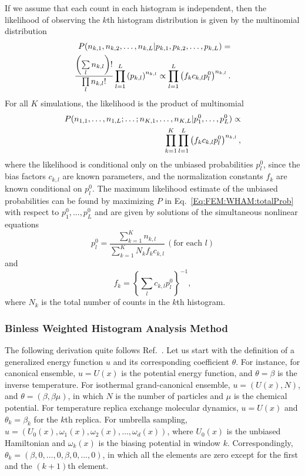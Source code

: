 If we assume that each count in each histogram is independent, then the likelihood of observing the $k$th histogram distribution is given by the multinomial distribution
\begin{align}
P(n_{k,1},n_{k,2},\dots,n_{k,L}|p_{k,1},p_{k,2},\dots,p_{k,L})=\notag\\
\frac{\left(\sum\limits_l n_{k,l}\right)!}{\prod\limits_l n_{k,l}!}\prod\limits_{l=1}^L\left(p_{k,l}\right)^{n_{k,l}}\propto\prod\limits_{l=1}^{L}\left(f_kc_{k,l}p_l^0\right)^{n_{k,l}}.
\end{align}
For all $K$ simulations, the likelihood is the product of multinomial
\begin{align}
P(n_{1,1},\dots,n_{1,L};\dots;n_{K,1},\dots,n_{K,L}|p_1^0,\dots,p_L^0)\propto\notag\\
\prod\limits_{k=1}^K\prod\limits_{l=1}^{L}\left(f_kc_{k,l}p_l^0\right)^{n_{k,l}},
\label{Eq:FEM:WHAM:totalProb}
\end{align}
where the likelihood is conditional only on the unbiased probabilities $p_l^0$, since the bias factors $c_{k,l}$ are known parameters, and the normalization constants $f_k$ are known conditional on $p_l^0$. The maximum likelihood estimate of the unbiased probabilities can be found by maximizing $P$ in Eq.~\ref{Eq:FEM:WHAM:totalProb} with respect to $p_1^0,\dots,p_L^0$ and are given by solutions of the simultaneous nonlinear equations
\begin{equation}
p_l^0=\frac{\sum\limits_{k=1}^K n_{k,l}}{\sum\limits_{k=1}^K N_kf_kc_{k,l}}\, (\text{for each }l)
\end{equation}
and
\begin{equation}
f_k={\left\{\sum\limits_lc_{k,l}p_l^0\right\}}^{-1},
\end{equation}
where $N_k$ is the total number of counts in the $k$th histogram.

\subsubsection{Binless Weighted Histogram Analysis Method\label{Sec:FEM:WHAM_BINLESS}}
The following derivation quite follows Ref.~\cite{TanJCP2012}.
Let us start with the definition of a generalized energy function $u$ and its corresponding coefficient $\theta$. For instance, for canonical ensemble, $u=U(x)$ is the potential energy function, and $\theta=\beta$ is the inverse temperature. For isothermal grand-canonical ensemble, $u=(U(x),N)$, and $\theta=(\beta,\beta\mu)$, in which $N$ is the number of particles and $\mu$ is the chemical potential. For temperature replica exchange molecular dynamics, $u=U(x)$ and $\theta_k=\beta_k$ for the $k$th replica. For umbrella sampling, $u=(U_0(x),\omega_1(x),\omega_2(x),\dots,\omega_d(x))$, where $U_0(x)$ is the unbiased Hamiltonian and $\omega_k(x)$ is the biasing potential in window $k$. Correspondingly, $\theta_k=(\beta,0,\dots,0,\beta,0,\dots,0)$, in which all the elements are zero except for the first and the $(k+1)$th element.

